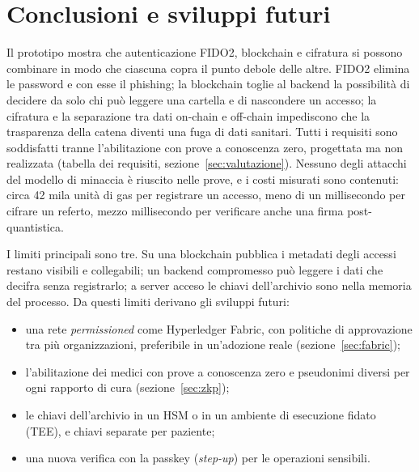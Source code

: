 \section{Conclusioni e sviluppi futuri}\label{sec:conclusioni}

Il prototipo mostra che autenticazione FIDO2, blockchain e cifratura si possono combinare in modo che ciascuna copra il punto debole delle altre. FIDO2 elimina le password e con esse il phishing; la blockchain toglie al backend la possibilità di decidere da solo chi può leggere una cartella e di nascondere un accesso; la cifratura e la separazione tra dati on-chain e off-chain impediscono che la trasparenza della catena diventi una fuga di dati sanitari. Tutti i requisiti sono soddisfatti tranne l'abilitazione con prove a conoscenza zero, progettata ma non realizzata (tabella dei requisiti, sezione~\ref{sec:valutazione}). Nessuno degli attacchi del modello di minaccia è riuscito nelle prove, e i costi misurati sono contenuti: circa 42 mila unità di gas per registrare un accesso, meno di un millisecondo per cifrare un referto, mezzo millisecondo per verificare anche una firma post-quantistica.

I limiti principali sono tre. Su una blockchain pubblica i metadati degli accessi restano visibili e collegabili; un backend compromesso può leggere i dati che decifra senza registrarlo; a server acceso le chiavi dell'archivio sono nella memoria del processo. Da questi limiti derivano gli sviluppi futuri:
\begin{itemize}
  \item una rete \emph{permissioned} come Hyperledger Fabric, con politiche di approvazione tra più organizzazioni, preferibile in un'adozione reale (sezione~\ref{sec:fabric});
  \item l'abilitazione dei medici con prove a conoscenza zero e pseudonimi diversi per ogni rapporto di cura (sezione~\ref{sec:zkp});
  \item le chiavi dell'archivio in un HSM o in un ambiente di esecuzione fidato (TEE), e chiavi separate per paziente;
  \item una nuova verifica con la passkey (\emph{step-up}) per le operazioni sensibili.
\end{itemize}
